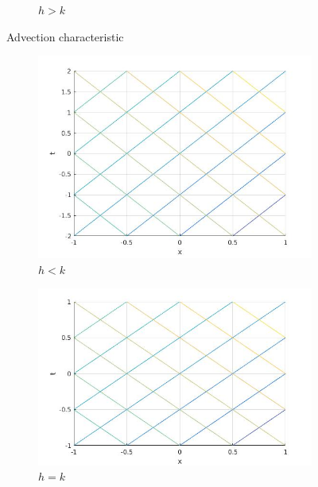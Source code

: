 \begin{figure}[H]
\begin{subfigure}[b]{0.3\textwidth}
  \caption{$h>k$}
  \label{fig:aci3}
\end{subfigure}
\caption{Advection characteristic}
\label{fig:advcoordimg}
\end{figure}
\begin{figure}[H]
\centering
\begin{subfigure}[b]{0.3\textwidth}
  \centering
  \includegraphics[width=\textwidth]{Images/wave_h<k.jpg}
  \caption{$h<k$}
  \label{fig:wci1}
\end{subfigure}
\hfill
\begin{subfigure}[b]{0.3\textwidth}
  \includegraphics[width=\textwidth]{Images/wave_h=k.jpg}
  \caption{$h=k$}
  \label{fig:wci2}
\end{subfigure}
\hfill
\begin{subfigure}[b]{0.3\textwidth}

\end{subfigure}
\end{figure}
